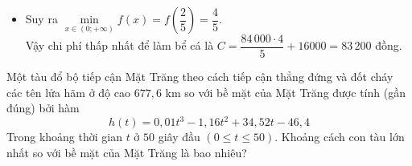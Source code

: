 \begin{ex}
{\begin{itemchoice}
\begin{itemize}
\begin{center}
				\end{center}
				\item Suy ra $\min\limits_{x\in (0;+\infty)} f(x)=f\left(\dfrac{2}{5}\right)=\dfrac{4}{5}$.\\
				Vậy chi phí thấp nhất để làm bể cá là $C=\dfrac{84\,000\cdot 4}{5}+16000=83\,200$ đồng.
			\end{itemize}
		\end{itemchoice}
	}
\end{ex}

\begin{ex}%
	Một tàu đổ bộ tiếp cận Mặt Trăng theo cách tiếp cận thẳng đứng và đốt cháy các tên lửa hãm ở độ cao $677{,}6$ km so với bề mặt của Mặt Trăng được tính (gần đúng) bởi hàm
	\[h(t) = 0{,}01t^3 - 1{,}16t^2 + 34{,}52t - 46{,}4\]
	Trong khoảng thời gian $t$ ở $50$ giây đầu $(0 \le t \le 50)$. Khoảng cách con tàu lớn nhất so với bề mặt của Mặt Trăng là bao nhiêu?
	
\end{ex}

